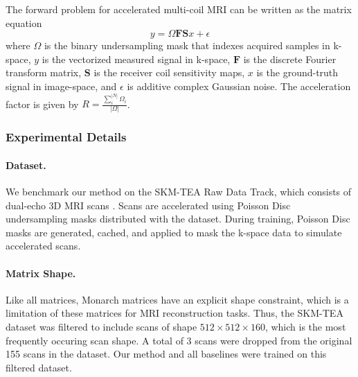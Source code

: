 The forward problem for accelerated multi-coil MRI can be written as the matrix equation
\begin{equation*}
    y = \Omega\boldsymbol{F}\boldsymbol{S}x + \epsilon
\end{equation*}
where $\Omega$ is the binary undersampling mask that indexes acquired samples in k-space, $y$ is the vectorized measured signal in k-space, $\boldsymbol{F}$ is the discrete Fourier transform matrix, $\boldsymbol{S}$ is the receiver coil sensitivity maps,  $x$ is the ground-truth signal in image-space, and $\epsilon$ is additive complex Gaussian noise. The acceleration factor is given by $R = \frac{\sum_i^{|N|} \Omega_i}{|\Omega|}$.

\subsubsection{Experimental Details}

\paragraph{Dataset.} We benchmark our method on the SKM-TEA Raw Data Track, which consists of dual-echo 3D MRI scans \citep{desai2021skm}. Scans are accelerated using Poisson Disc undersampling masks distributed with the dataset. During training, Poisson Disc masks are generated, cached, and applied to mask the k-space data to simulate accelerated scans.

\paragraph{Matrix Shape.} Like all matrices, Monarch matrices have an explicit shape constraint, which is a limitation of these matrices for MRI reconstruction tasks. Thus, the SKM-TEA dataset was filtered to include scans of shape $512 \times 512 \times 160$, which is the most frequently occuring scan shape. A total of 3 scans were dropped from the original 155 scans in the dataset. Our method and all baselines were trained on this filtered dataset.

\begin{table}[!ht]
    \vspace{-0.5cm}
\centering
\caption{Baseline configurations of the SKM-TEA MRI reconstruction experiments.}
\label{table:skmtea-config}
\end{table}


